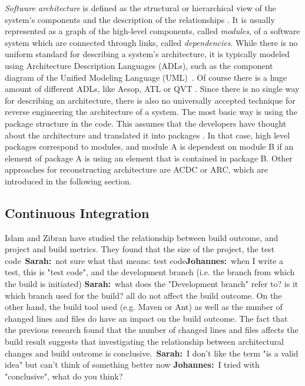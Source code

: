 \documentclass[sigplan, anonymous, review]{acmart}
\newcommand{\sn}[1]{{\color{blue}\textbf{Sarah:}~#1}}
\newcommand{\jk}[1]{{\color{violet}\textbf{Johannes:}~#1}}
\begin{document}
\textit{Software architecture} is defined as the structural or hierarchical view of the system's components and the description of the relationships \cite{arcDef}. It is usually represented as a graph of the high-level components, called \textit{modules}, of a software system which are connected through links, called \textit{dependencies}. While there is no uniform standard for describing a system's architecture, it is typically modeled using Architecture Description Languages (ADLs), such as the component diagram of the Unified Modeling Language (UML)~\cite{UML-Arch}. Of course there is a huge amount of different ADLs, like Aesop, ATL or QVT \cite{ADLs1, ADLs2}.
Since there is no single way for describing an architecture, there is also no universally accepted technique for reverse engineering the architecture of a system. The most basic way is using the package structure in the code. This assumes that the developers have thought about the architecture and translated it into packages \cite{arcPkg}. In that case, high level packages correspond to modules, and module A is dependent on module B if an element of package A is using an element that is contained in package B. 
Other approaches for reconstructing architecture are ACDC or ARC, which are introduced in the following section.

\subsection{Continuous Integration}

Islam and Zibran \cite{FailsCorr} have studied the relationship between build outcome, and project and build metrics. 
They found that the size of the project, the test code~\sn{not sure what that means: test code}\jk{when I write a test, this is "test code"}, and the development branch (i.e. the branch from which the build is initiated) \sn{what does the "Development branch" refer to? is it which branch used for the build?} all do not affect the build outcome.
On the other hand, the build tool used (e.g. Maven or Ant) as well as the number of changed lines and files do have an impact on the build outcome.
The fact that the previous research found that the number of changed lines and files affects the build result suggests that investigating the relationship between architectural changes and build outcome is conclusive.~\sn{I don't like the term "is a valid idea" but can't think of something better now} \jk{I tried with "conclusive", what do you think?}
\end{document}
